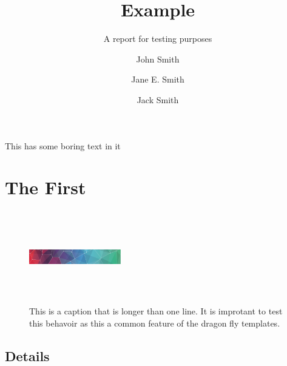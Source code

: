 \documentclass[draft]{dragonfly-report}
\title{Example}{An Example\\ Report about \emph{sheep}}
\subtitle{A report for testing purposes}
\author{John Smith \and Jane E. Smith \and Jack Smith}
\begin{document}


\maketitle

\tableofcontents

\summary%

This has some boring text in it

\section{The First}

\lipsum[1]


\begin{figure}[h]
  \includegraphics[width=40mm,height=40mm]{pattern}
  \caption{This is a caption that is longer than one line. It is improtant to test 
  this behavoir as this a common feature of the dragon fly templates.}
\end{figure}

\subsection{Details}

\lipsum[2]
\end{document}
